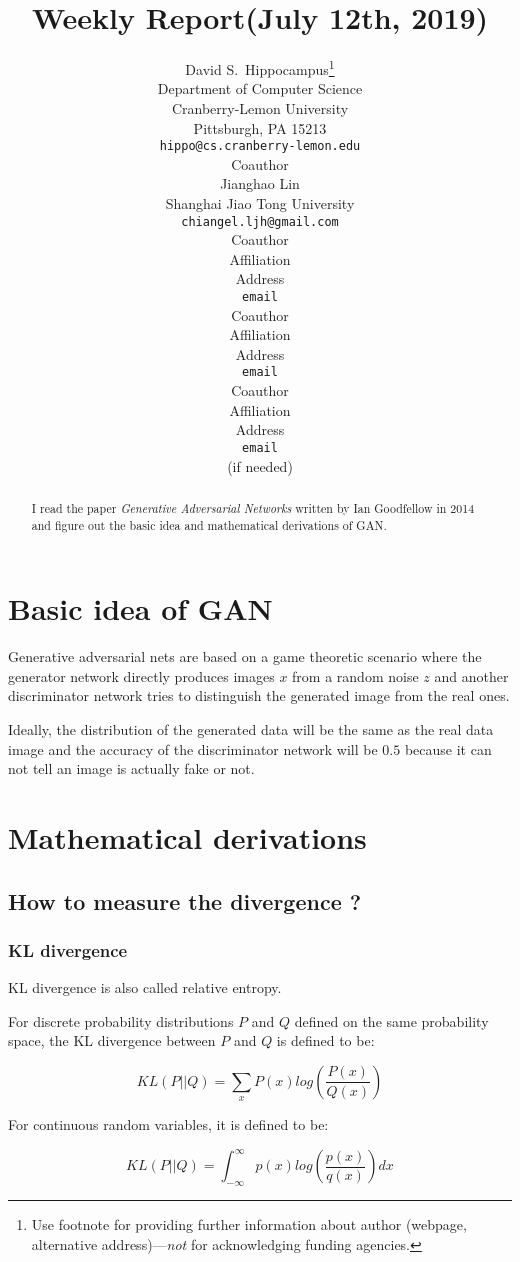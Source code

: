 \documentclass{article} %
\title{Weekly Report(July 12th, 2019)
}
\author{
David S.~Hippocampus\thanks{ Use footnote for providing further information
about author (webpage, alternative address)---\emph{not} for acknowledging
funding agencies.} \\
Department of Computer Science\\
Cranberry-Lemon University\\
Pittsburgh, PA 15213 \\
\texttt{hippo@cs.cranberry-lemon.edu} \\
\And
Coauthor \\
Jianghao Lin \\
Shanghai Jiao Tong University \\
\texttt{chiangel.ljh@gmail.com} \\
\AND
Coauthor \\
Affiliation \\
Address \\
\texttt{email} \\
\And
Coauthor \\
Affiliation \\
Address \\
\texttt{email} \\
\And
Coauthor \\
Affiliation \\
Address \\
\texttt{email} \\
(if needed)\\
}
\begin{document}
\maketitle

\begin{abstract}
I read the paper \emph{Generative Adversarial Networks} written by Ian Goodfellow in 2014 and figure out the basic idea and mathematical derivations of GAN.
\end{abstract}

\section{Basic idea of GAN}

Generative adversarial nets are based on a game theoretic scenario where the generator network directly produces images $x$ from a random noise $z$ and another discriminator network tries to distinguish the generated image from the real ones.

Ideally, the distribution of the generated data will be the same as the real data image and the accuracy of the discriminator network will be $0.5$ because it can not tell an image is actually fake or not.

\section{Mathematical derivations}

\subsection{How to measure the divergence ?}

\subsubsection{KL divergence}

KL divergence is also called relative entropy. 

For discrete probability distributions $P$ and $Q$ defined on the same probability space, the KL divergence between $P$ and $Q$ is defined to be:

\begin{equation}
    KL(P||Q) = \sum_{x}P(x)log(\frac{P(x)}{Q(x)})
\end{equation}

For continuous random variables, it is defined to be:

\begin{equation}
    KL(P||Q) = \int_{-\infty}^{\infty}p(x)log(\frac{p(x)}{q(x)})dx
\end{equation}
\end{document}
